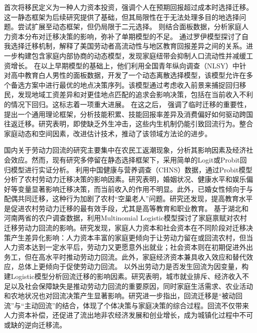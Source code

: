 \documentclass[a4paper, zihao=-4, fontset = mac, oneside]{ctexbook} %
\begin{document}
\textcite{sjaastadCostsReturnsHuman1962}首次将移民定义为一种人力资本投资，强调个人在预期回报超过成本时选择迁移。这一静态框架为后续研究提供了基础，但其局限性在于无法处理多目的地选择问题。\textcite{tunaliRationalityMigration2000}尝试扩展至动态框架，但仍局限于二元选择。
\textcite{dierxLifecycleModelRepeat1988}则结合面板数据，分析家庭人力资本分布对迁移决策的影响，弥补了单期模型的不足。
\textcite{dahlMobilityReturnEducation2002} 通过罗伊模型探讨了自我选择迁移机制，解释了美国劳动者高流动性与地区教育回报差异之间的关系。\textcite{gemiciFamilyMigrationLabor2007}进一步构建包含家庭内部协商的动态模型，发现家庭纽带会抑制人口流动性并减缓工资增长。
在以上早期模型的基础上，\textcite{kennanEffectExpectedIncome2011}他们利用全国青年纵向调查（NLSY）中针对高中教育白人男性的面板数据，开发了一个动态离散选择模型，该模型允许在多个备选方案中进行最优的地点决策序列。该模型通过考虑收入前景来捕捉回归移民，发现地域工资差异和对更佳地点匹配的追求会影响决策，包括在当前收入不利的情况下回归。这标志着一项重大进展。
在这之后，
\textcite{dustmannEconomicsTemporaryMigrations2016}强调了临时迁移的重要性，提出一个通用理论框架，分析技能积累、技能回报率差异及消费偏好如何驱动跨国往返迁移。研究表明，即使缺乏外生冲击，这些内生机制仍能引致回流行为。\textcite{venatorDualEarnerMigrationDecisions2022}整合家庭动态和空间因素，改进估计技术，推动了该领域方法论的进步。


国内关于劳动力回流的研究主要集中在农民工返潮现象，分析其影响因素及经济社会效应。然而，现有研究多停留在静态选择框架下，采用简单的Logit或Probit回归模型进行实证分析。
\textcite{WangZhiQiangZhongGuoNongCunLaoDongLiQianYiYingXiangYinSuYanJiuJiYuProbitMoXingDeShiZhengFenXi2011}利用中国健康与营养调查（CHNS）数据，通过Probit模型分析了农村劳动力迁移决策的影响因素。研究表明，婚姻状况、健康水平和娱乐偏好等变量显著影响迁移决策，而当前收入的作用不明显。此外，已婚女性倾向于与配偶共同迁移，这种行为加剧了农村“空巢老人”问题。研究还发现，提高教育水平是促进农村劳动力迁移的最有效手段，尤其是高等教育和职业教育。
\textcite{ShiZhiLeiJiaTingBingFuJiaTingJueCeYuNongCunQianYiLaoDongLiHuiLiu2012}基于湖北和河南两省的农户调查数据，利用Multinomial Logistic模型探讨了家庭禀赋对农村迁移劳动力回流的影响。研究发现，家庭人力资本和社会资本在不同阶段对迁移决策产生差异化影响：人力资本丰富的家庭更倾向于让劳动力留在或回流农村，但当人力资本达到一定水平后，劳动力又更愿意外出就业；社会资本则在初期促进外出务工，但在高水平时推动劳动力回流。此外，家庭经济资本兼具收入效应和替代效应，总体上更倾向于促使劳动力回流。
\textcite{RenYuanNongCunWaiChuLaoDongLiHuiLiuQianYiDeYingXiangYinSuHeHuiLiuXiaoYing2017}以外出劳动力是否发生回流为因变量，构建Logistic模型分析回流迁移的影响因素。研究表明，城市就业排斥、经济收入不足以及社会保障缺失是推动劳动力回流的重要原因，同时家庭生活需求、农业活动和农地状况也对回流决策产生显著影响。研究进一步指出，回流迁移是“被动回流”与“主动回流”的结合，体现了个体决策与家庭决策的综合过程。回流不仅带来人力资本补偿，还促进了流出地非农经济发展和创业增长，成为城镇化过程中不可或缺的逆向迁移流。
\end{document}
